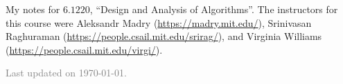 \documentclass[11pt]{article}
\begin{document}
\maketitle



My notes for $6.1220$, ``Design and Analysis of Algorithms''. The instructors for this course were Aleksandr Madry (\url{https://madry.mit.edu/}), Srinivasan Raghuraman (\url{https://people.csail.mit.edu/srirag/}), and Virginia Williams (\url{https://people.csail.mit.edu/virgi/}). 

\vfill

\hfill \textcolor{gray}{\small Last updated on \today.}
\newpage
\tableofcontents 
\newpage
\importfiles %
\end{document}
